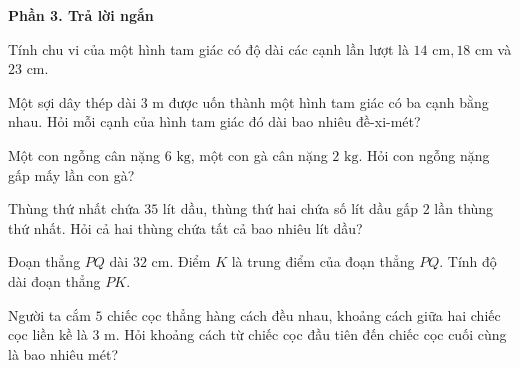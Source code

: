 \textbf{Phần 3. Trả lời ngắn}

\begin{ex} %
Tính chu vi của một hình tam giác có độ dài các cạnh lần lượt là $14\text{ cm}, 18\text{ cm}$ và $23\text{ cm}$.
\end{ex}

\begin{ex} %
Một sợi dây thép dài $3\text{ m}$ được uốn thành một hình tam giác có ba cạnh bằng nhau. Hỏi mỗi cạnh của hình tam giác đó dài bao nhiêu đề-xi-mét?
\end{ex}

\begin{ex} %
Một con ngỗng cân nặng $6\text{ kg}$, một con gà cân nặng $2\text{ kg}$. Hỏi con ngỗng nặng gấp mấy lần con gà?
\end{ex}

\begin{ex} %
Thùng thứ nhất chứa $35\text{ lít}$ dầu, thùng thứ hai chứa số lít dầu gấp $2$ lần thùng thứ nhất. Hỏi cả hai thùng chứa tất cả bao nhiêu lít dầu?
\end{ex}

\begin{ex} %
Đoạn thẳng $PQ$ dài $32\text{ cm}$. Điểm $K$ là trung điểm của đoạn thẳng $PQ$. Tính độ dài đoạn thẳng $PK$.
\end{ex}

\begin{ex} %
Người ta cắm $5$ chiếc cọc thẳng hàng cách đều nhau, khoảng cách giữa hai chiếc cọc liền kề là $3\text{ m}$. Hỏi khoảng cách từ chiếc cọc đầu tiên đến chiếc cọc cuối cùng là bao nhiêu mét?
\end{ex}
